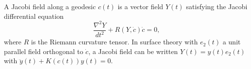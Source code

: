 A Jacobi field along a geodesic $c(t)$ is a vector field $Y(t)$ satisfying the Jacobi differential equation
$$\frac{\nabla^2 Y}{dt^2} + R(Y, \dot{c})\dot{c} = 0,$$
where $R$ is the Riemann curvature tensor. In surface theory with $e_2(t)$ a unit parallel field orthogonal to $\dot{c}$, a Jacobi field can be written $Y(t) = y(t)e_2(t)$ with $\ddot{y}(t) + K(c(t))y(t) = 0$.